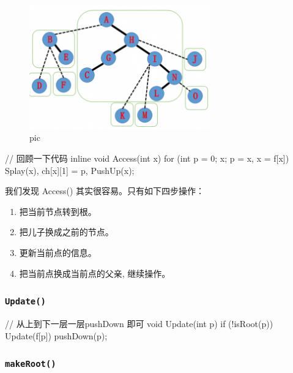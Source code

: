 \begin{figure}[htbp]
\centering
\includegraphics[width=0.7\textwidth]{docs/ds/images/lct7.png} 
\caption{pic}
\end{figure}

\begin{cppcode}
// 回顾一下代码
inline void Access(int x) {
  for (int p = 0; x; p = x, x = f[x]) {
    Splay(x), ch[x][1] = p, PushUp(x);
  }
}
\end{cppcode}

我们发现 Access() 其实很容易。只有如下四步操作：

\begin{enumerate}
\item 把当前节点转到根。
\item 把儿子换成之前的节点。
\item 更新当前点的信息。
\item 把当前点换成当前点的父亲, 继续操作。
\end{enumerate}

\subsubsection{\texttt{Update()}}

\begin{cppcode}
// 从上到下一层一层pushDown 即可
void Update(int p) {
  if (!isRoot(p)) Update(f[p]) pushDown(p);
}
\end{cppcode}

\subsubsection{\texttt{makeRoot()}}

